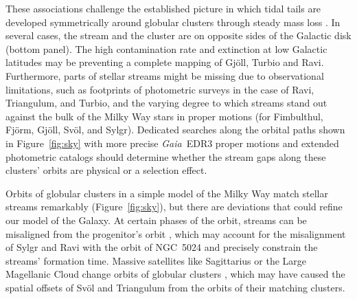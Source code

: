 \documentclass[twocolumn]{aastex63}
\newcommand{\gaia}{\textsl{Gaia}}
\begin{document}
These associations challenge the established picture in which tidal tails are developed symmetrically around globular clusters through steady mass loss \citep[e.g.,][]{kuepper2010}.
In several cases, the stream and the cluster are on opposite sides of the Galactic disk (bottom panel).
The high contamination rate and extinction at low Galactic latitudes may be preventing a complete mapping of Gj\" oll, Turbio and Ravi.
Furthermore, parts of stellar streams might be missing due to observational limitations, such as footprints of photometric surveys in the case of Ravi, Triangulum, and Turbio, and the varying degree to which streams stand out against the bulk of the Milky Way stars in proper motions (for Fimbulthul, Fj\" orm, Gj\" oll, Sv\" ol, and Sylgr).
Dedicated searches along the orbital paths shown in Figure~\ref{fig:sky} with more precise \gaia\ EDR3 proper motions \citep{gaiaedr3} and extended photometric catalogs \citep{dey2019} should determine whether the stream gaps along these clusters' orbits are physical or a selection effect.


Orbits of globular clusters in a simple model of the Milky Way match stellar streams remarkably (Figure~\ref{fig:sky}), but there are deviations that could refine our model of the Galaxy.
At certain phases of the orbit, streams can be misaligned from the progenitor's orbit \citep{sanders2013}, which may account for the misalignment of Sylgr and Ravi with the orbit of NGC~5024 and precisely constrain the streams' formation time.
Massive satellites like Sagittarius or the Large Magellanic Cloud change orbits of globular clusters \citep{garrow2020}, which may have caused the spatial offsets of Sv\" ol and Triangulum from the orbits of their matching clusters.

\end{document}

